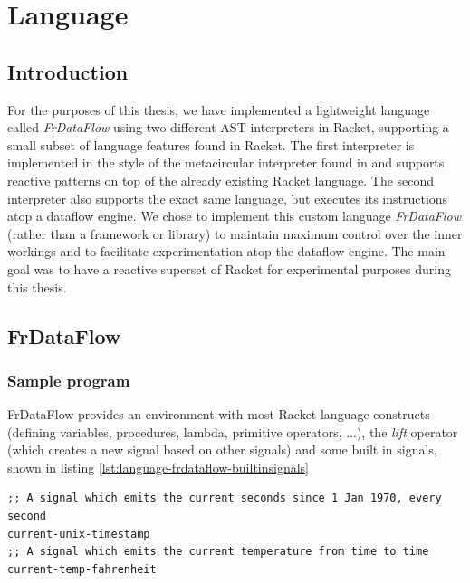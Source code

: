 \chapter{Language}
\lstset{language=lisp,showtabs=false}

\section{Introduction}

For the purposes of this thesis, we have implemented a lightweight language called \textit{FrDataFlow} using two different AST interpreters in Racket, supporting a small subset of language features found in Racket. The first interpreter is implemented in the style of the metacircular interpreter found in \citet{abelson_structure_1999} and supports reactive patterns on top of the already existing Racket language. The second interpreter also supports the exact same language, but executes its instructions atop a dataflow engine. We chose to implement this custom language \textit{FrDataFlow} (rather than a framework or library) to maintain maximum control over the inner workings and to facilitate experimentation atop the dataflow engine. The main goal was to have a reactive superset of Racket for experimental purposes during this thesis.

\newpage
\section{FrDataFlow}


\subsection{Sample program}

FrDataFlow provides an environment with most Racket language constructs (defining variables, procedures, lambda, primitive operators, ...), the \textit{lift} operator (which creates a new signal based on other signals) and some built in signals, shown in listing \ref{lst:language-frdataflow-builtinsignals}

\begin{lstlisting}[caption={Built in signals},captionpos=b,label={lst:language-frdataflow-builtinsignals}]
;; A signal which emits the current seconds since 1 Jan 1970, every second
current-unix-timestamp	
;; A signal which emits the current temperature from time to time
current-temp-fahrenheit 
\end{lstlisting}

